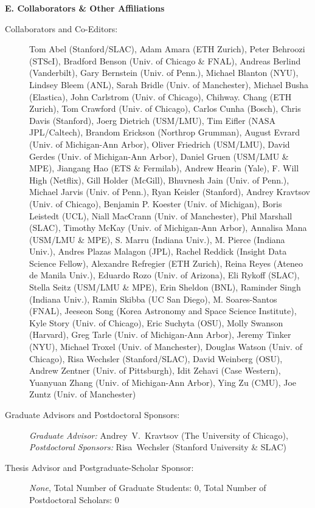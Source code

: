 \documentclass[10pt]{article}
\begin{document}
{\large \bf E. Collaborators \& Other Affiliations}
\begin{description}
\item[Collaborators and Co-Editors:]

Tom Abel (Stanford/SLAC),
Adam Amara (ETH Zurich),
Peter Behroozi (STScI),
Bradford Benson (Univ. of Chicago \& FNAL),
Andreas Berlind (Vanderbilt),
Gary Bernstein (Univ. of Penn.),
Michael Blanton (NYU),
Lindsey Bleem (ANL),
Sarah Bridle (Univ. of Manchester),
Michael Busha (Elastica),
John Carlstrom (Univ. of Chicago),
Chihway. Chang (ETH Zurich),
Tom Crawford (Univ. of Chicago),
Carlos Cunha (Bosch), 
Chris Davis (Stanford),
Joerg Dietrich (USM/LMU),
Tim Eifler (NASA JPL/Caltech),
Brandom Erickson (Northrop Grumman),
August Evrard (Univ. of Michigan-Ann Arbor), 
Oliver Friedrich (USM/LMU),
David Gerdes (Univ. of Michigan-Ann Arbor), 
Daniel Gruen (USM/LMU \& MPE),
Jiangang Hao (ETS \& Fermilab), 
Andrew Hearin (Yale),
F. Will High (Netflix), 
Gill Holder (McGill),
Bhuvnesh Jain (Univ. of Penn.),
Michael Jarvis (Univ. of Penn.),
Ryan Keisler (Stanford),
Andrey Kravtsov (Univ. of Chicago),
Benjamin P. Koester (Univ. of Michigan),
Boris Leistedt (UCL),
Niall MacCrann (Univ. of Manchester),
Phil Marshall (SLAC),
Timothy McKay (Univ. of Michigan-Ann Arbor), 
Annalisa Mana (USM/LMU \& MPE),
S. Marru (Indiana Univ.),
M. Pierce (Indiana Univ.),
Andres Plazas Malagon (JPL),
Rachel Reddick (Insight Data Science Fellow),
Alexandre Refregier (ETH Zurich),
Reina Reyes (Ateneo de Manila Univ.),
Eduardo Rozo (Univ. of Arizona), 
Eli Rykoff (SLAC),
Stella Seitz (USM/LMU \& MPE),
Erin Sheldon (BNL),
Raminder Singh (Indiana Univ.),
Ramin Skibba (UC San Diego),
M. Soares-Santos (FNAL), 
Jeeseon Song (Korea Astronomy and Space Science Institute),
Kyle Story (Univ. of Chicago),
Eric Suchyta (OSU),
Molly Swanson (Harvard), 
Greg Tarle (Univ. of Michigan-Ann Arbor), 
Jeremy Tinker (NYU),
Michael Troxel (Univ. of Manchester),
Douglas Watson (Univ. of Chicago),
Risa Wechsler (Stanford/SLAC),
David Weinberg (OSU),
Andrew Zentner (Univ. of Pittsburgh),
Idit Zehavi (Case Western),
Yuanyuan Zhang (Univ. of Michigan-Ann Arbor),
Ying Zu (CMU),
Joe Zuntz (Univ. of Manchester)

\item[Graduate Advisors and Postdoctoral Sponsors:] \textit{Graduate Advisor:} Andrey~V.~Kravtsov (The University of Chicago), \textit{Postdoctoral Sponsors:} Risa~Wechsler (Stanford University \& SLAC)
\item[Thesis Advisor and Postgraduate-Scholar Sponsor:] \textit{None}, Total Number of Graduate Students: 0, Total Number of Postdoctoral Scholars: 0
\end{description}
\end{document}
